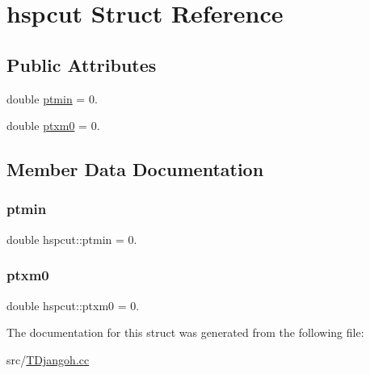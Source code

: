 \hypertarget{structhspcut}{}\section{hspcut Struct Reference}
\label{structhspcut}
\subsection*{Public Attributes}
\begin{DoxyCompactItemize}
\item 
double \hyperlink{structhspcut_afb1756d86ce6365f406dc555b0161105}{ptmin} = 0.
\item 
double \hyperlink{structhspcut_ab8baa4973ff7f48b1bf5ffde62f66d0d}{ptxm0} = 0.
\end{DoxyCompactItemize}


\subsection{Member Data Documentation}
\mbox{\label{structhspcut_afb1756d86ce6365f406dc555b0161105}} 
\subsubsection{\texorpdfstring{ptmin}{ptmin}}
{\footnotesize\ttfamily double hspcut\+::ptmin = 0.}

\mbox{\label{structhspcut_ab8baa4973ff7f48b1bf5ffde62f66d0d}} 
\subsubsection{\texorpdfstring{ptxm0}{ptxm0}}
{\footnotesize\ttfamily double hspcut\+::ptxm0 = 0.}



The documentation for this struct was generated from the following file\+:\begin{DoxyCompactItemize}
\item 
src/\hyperlink{_t_djangoh_8cc}{T\+Djangoh.\+cc}\end{DoxyCompactItemize}
